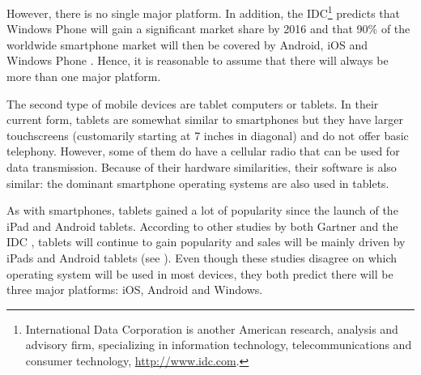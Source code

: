 However, there is no single major platform. In addition, the IDC\footnote{International Data Corporation is another American research, analysis and advisory firm, specializing in information technology, telecommunications and consumer technology, \url{http://www.idc.com}.} predicts that Windows Phone will gain a significant market share by 2016 and that 90\% of the worldwide smartphone market will then be covered by Android, iOS and Windows Phone \cite{IDC:phone}. Hence, it is reasonable to assume that there will always be more than one major platform.

The second type of mobile devices are tablet computers or tablets. In their current form, tablets are somewhat similar to smartphones but they have larger touchscreens (customarily starting at 7 inches in diagonal) and do not offer basic telephony. However, some of them do have a cellular radio that can be used for data transmission. Because of their hardware similarities, their software is also similar: the dominant smartphone operating systems are also used in tablets.

As with smartphones, tablets gained a lot of popularity since the launch of the iPad and Android tablets. According to other studies by both Gartner \citep{Gartner:11tab,Gartner:12tab} and the IDC \citep{IDC:tablet}, tablets will continue to gain popularity and sales will be mainly driven by iPads and Android tablets (see ). Even though these studies disagree on which operating system will be used in most devices, they both predict there will be three major platforms: iOS, Android and Windows. 

